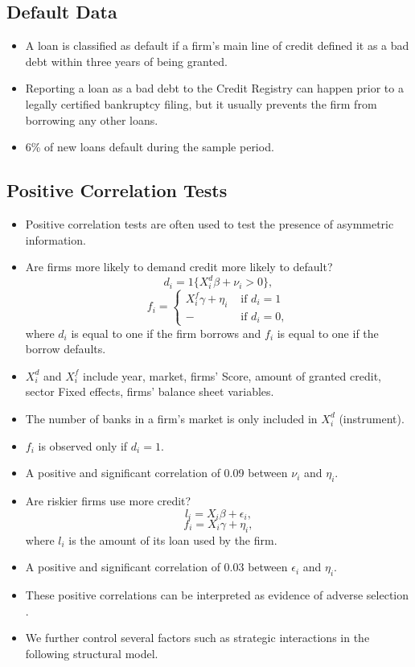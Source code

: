 \documentclass[
]{book}
\providecommand{\tightlist}{%
  \setlength{\itemsep}{0pt}\setlength{\parskip}{0pt}}
\begin{document}
\hypertarget{default-data}{%
\subsection{Default Data}\label{default-data}}

\begin{itemize}
\tightlist
\item
  A loan is classified as default if a firm's main line of credit defined it as a bad debt within three years of being granted.
\item
  Reporting a loan as a bad debt to the Credit Registry can happen prior to a legally certified bankruptcy filing, but it usually prevents the firm from borrowing any other loans.
\item
  6\% of new loans default during the sample period.
\end{itemize}

\hypertarget{positive-correlation-tests}{%
\subsection{Positive Correlation Tests}\label{positive-correlation-tests}}

\begin{itemize}
\tightlist
\item
  Positive correlation tests \citep{chiapporiTestingAsymmetricInformation2000} are often used to test the presence of asymmetric information.
\item
  Are firms more likely to demand credit more likely to default?
  \[
  d_i = 1\{X_i^d \beta + \nu_i > 0\},
  \]
  \[
  f_i =
  \begin{cases}
  X_i^f \gamma + \eta_i &\text{   if   } d_i = 1\\
  -&\text{    if   } d_i = 0,
  \end{cases}
  \]
  where \(d_i\) is equal to one if the firm borrows and \(f_i\) is equal to one if the borrow defaults.
\item
  \(X_i^d\) and \(X_i^f\) include year, market, firms' Score, amount of granted credit, sector Fixed effects, firms' balance sheet variables.
\item
  The number of banks in a firm's market is only included in \(X_i^d\) (instrument).
\item
  \(f_i\) is observed only if \(d_i = 1\).
\item
  A positive and significant correlation of 0.09 between \(\nu_i\) and \(\eta_i\).
\item
  Are riskier firms use more credit?
  \[
  l_i = X_i \beta + \epsilon_i,
  \]
  \[
  f_i = X_i \gamma + \eta_i,
  \]
  where \(l_i\) is the amount of its loan used by the firm.
\item
  A positive and significant correlation of 0.03 between \(\epsilon_i\) and \(\eta_i\).
\item
  These positive correlations can be interpreted as evidence of adverse selection \citep{stiglitzCreditRationingMarkets1981}.
\item
  We further control several factors such as strategic interactions in the following structural model.
\end{itemize}
\end{document}
